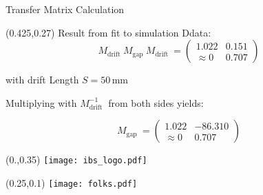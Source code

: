 \documentclass[10pt,aspectratio=169]{beamer}
\begin{document}
\begin{frame}{Transfer Matrix Calculation}
    \begin{textblock*}{0.5\paperwidth}(0.425\paperwidth,0.27\paperheight)
        \centering
        Result from fit to simulation Ddata:
        \begin{equation*}
            M_\text{drift  } M_\text{gap  } M_\text{drift  } = \begin{pmatrix} 1.022 & 0.151 \\ \approx 0 & 0.707 \end{pmatrix}
        \end{equation*}

        with drift Length $S=50$\,mm

         \vspace{0.1\paperheight}
        
        Multiplying with $M_\text{drift  }^{-1}$ from both sides yields: 

        \begin{equation*}
            M_\text{gap  } = \begin{pmatrix} 1.022 & -86.310  \\ \approx 0 & 0.707 \end{pmatrix}
        \end{equation*}

            
    \end{textblock*}
    \begin{textblock*}{0.5\paperwidth}(0.\paperwidth,0.35\paperheight)
		\centering
		\texttt{[image: ibs\_logo.pdf]}
	\end{textblock*}
  

\end{frame}

\begin{SectionTitle}
	\begin{frame}
		\begin{textblock*}{0.5\paperwidth}(0.25\paperwidth,0.1\paperheight)
			\centering
            \texttt{[image: folks.pdf]}
			
		\end{textblock*}
	\end{frame}
 \end{SectionTitle}
\end{document}
